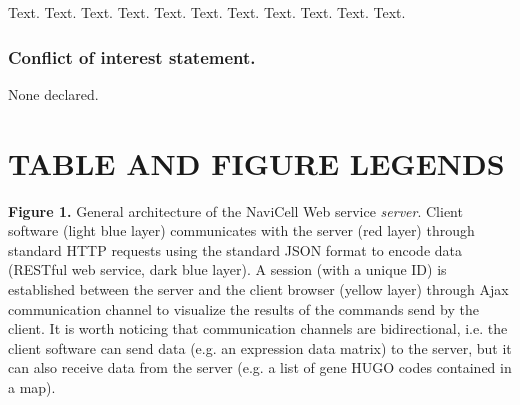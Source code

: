 \documentclass[a4,center,fleqn]{NAR}
\begin{document}
Text. Text. Text. Text. Text. Text. Text. Text. Text. Text. Text.


\subsubsection{Conflict of interest statement.} None declared.
\newpage



\section{TABLE AND FIGURE LEGENDS}

\textbf{Figure 1.} General architecture of the NaviCell Web service
\emph{server}. Client software (light blue layer) communicates with the server
(red layer) through standard HTTP requests using the standard JSON format to
encode data (RESTful web service, dark blue layer). A session (with a unique ID)
is established between the server and the client browser (yellow layer) through
Ajax communication channel to visualize the results of the commands send by the
client. It is worth noticing that communication channels are bidirectional, i.e.
the client software can send data (e.g. an expression data matrix) to the
server, but it can also receive data from the server (e.g. a list of gene HUGO
codes contained in a map).
\end{document}

